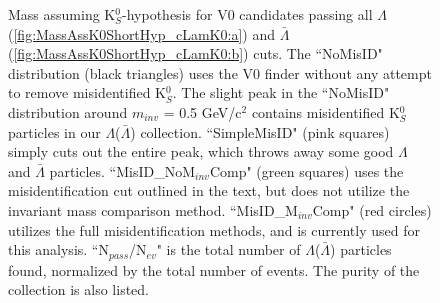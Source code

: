 \documentclass[../AnalysisNoteJBuxton.tex]{subfiles}
\begin{document}
\begin{figure}[h!]
  \centering
  \caption[K$^{0}_{S}$ contamination in $\Lambda$($\bar{\Lambda}$) collection]{Mass assuming K$^{0}_{S}$-hypothesis for V0 candidates passing all $\Lambda$ (\ref{fig:MassAssK0ShortHyp_cLamK0:a}) and $\bar{\Lambda}$ (\ref{fig:MassAssK0ShortHyp_cLamK0:b}) cuts.
  The ``NoMisID" distribution (black triangles) uses the V0 finder without any attempt to remove misidentified K$^{0}_{S}$.
  The slight peak in the ``NoMisID" distribution around $m_{inv}$ = 0.5 GeV/c$^{2}$ contains misidentified K$^{0}_{S}$ particles in our $\Lambda$($\bar{\Lambda}$) collection.  
  ``SimpleMisID" (pink squares) simply cuts out the entire peak, which throws away some good $\Lambda$ and $\bar{\Lambda}$ particles.
  ``MisID\_NoM$_{inv}$Comp" (green squares) uses the misidentification cut outlined in the text, but does not utilize the invariant mass comparison method.
  ``MisID\_M$_{inv}$Comp" (red circles) utilizes the full misidentification methods, and is currently used for this analysis.  
  ``N$_{pass}$/N$_{ev}$" is the total number of $\Lambda$($\bar{\Lambda}$) particles found, normalized by the total number of events.  The purity of the collection is also listed.}
  \label{fig:MassAssK0ShortHyp_cLamK0}
\end{figure}
\end{document}
